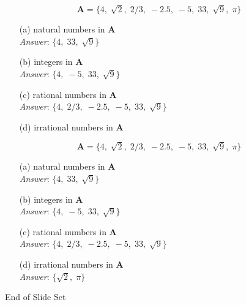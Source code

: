 \documentclass{beamer}
\begin{document}
\begin{frame}
\Large
\vspace{-0.5cm}
\[\boldsymbol{A} = \{4,\; \sqrt{2},\; 2/3,\; -2.5,\; -5,\; 33,\; \sqrt{9},\; \pi \}\]
\vspace{-0.5cm}
\begin{itemize}
\item[(a)] natural numbers in \textbf{A}\\
\hspace{1cm} \textit{Answer}: $\{4,\; 33,\; \sqrt{9}\}$
\item[(b)] integers in \textbf{A}\\
\hspace{1cm} \textit{Answer}: $\{4,\; -5,\; 33,\; \sqrt{9}\}$
\item[(c)] rational numbers in \textbf{A}\\
\hspace{1cm} \textit{Answer}: $\{4,\; 2/3,\; -2.5,\; -5,\; 33,\; \sqrt{9}\}$
\item[(d)] irrational numbers in \textbf{A}\\
\end{itemize}
\end{frame}
\begin{frame}
\Large
\vspace{-0.5cm}
\[\boldsymbol{A} = \{4,\; \sqrt{2},\; 2/3,\; -2.5,\; -5,\; 33,\; \sqrt{9},\; \pi \}\]
\vspace{-0.5cm}
\begin{itemize}
\item[(a)] natural numbers in \textbf{A}\\
\hspace{1cm} \textit{Answer}: $\{4,\; 33,\; \sqrt{9}\}$
\item[(b)] integers in \textbf{A}\\
\hspace{1cm} \textit{Answer}: $\{4,\; -5,\; 33,\; \sqrt{9}\}$
\item[(c)] rational numbers in \textbf{A}\\
\hspace{1cm} \textit{Answer}: $\{4,\; 2/3,\; -2.5,\; -5,\; 33,\; \sqrt{9}\}$
\item[(d)] irrational numbers in \textbf{A}\\
\hspace{1cm} \textit{Answer}: $\{\sqrt{2},\; \pi\}$
\end{itemize}
\end{frame}



\begin{frame}

End of Slide Set
\end{frame}
\end{document}
